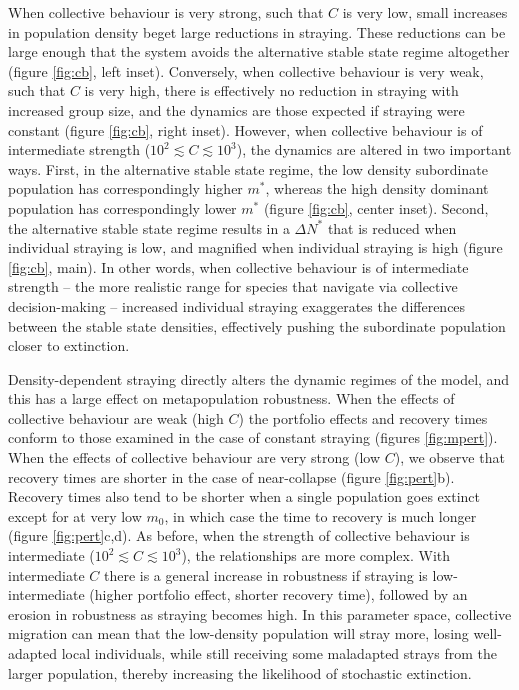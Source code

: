 \documentclass{revtex4}
\begin{document}
When collective behaviour is very strong, such that $C$ is very low, small increases in population density beget large reductions in straying.
These reductions can be large enough that the system avoids the alternative stable state regime altogether (figure \ref{fig:cb}, left inset).
Conversely, when collective behaviour is very weak, such that $C$ is very high, there is effectively no reduction in straying with increased group size, and the dynamics are those expected if straying were constant (figure \ref{fig:cb}, right inset).
However, when collective behaviour is of intermediate strength ($10^{2} \lesssim C \lesssim 10^3$), the dynamics are altered in two important ways.
First, in the alternative stable state regime, the low density subordinate population has correspondingly higher $m^*$, whereas the high density dominant population has correspondingly lower $m^*$ (figure \ref{fig:cb}, center inset).
Second, the alternative stable state regime results in a $\Delta N^*$ that is reduced when individual straying is low, and magnified when individual straying is high (figure \ref{fig:cb}, main).
In other words, when collective behaviour is of intermediate strength -- the more realistic range for species that navigate via collective decision-making -- increased individual straying exaggerates the differences between the stable state densities, effectively pushing the subordinate population closer to extinction.


Density-dependent straying directly alters the dynamic regimes of the model, and this has a large effect on metapopulation robustness.
When the effects of collective behaviour are weak (high $C$) the portfolio effects and recovery times conform to those examined in the case of constant straying (figures \ref{fig:mpert}).
When the effects of collective behaviour are very strong (low $C$), we observe that recovery times are shorter in the case of near-collapse (figure \ref{fig:pert}b).
Recovery times also tend to be shorter when a single population goes extinct except for at very low $m_0$, in which case the time to recovery is much longer (figure \ref{fig:pert}c,d).
As before, when the strength of collective behaviour is intermediate ($10^{2} \lesssim C \lesssim 10^3$), the relationships are more complex.
With intermediate $C$ there is a general increase in robustness if straying is low-intermediate (higher portfolio effect, shorter recovery time), followed by an erosion in robustness as straying becomes high.
In this parameter space, collective migration can mean that the low-density population will stray more, losing well-adapted local individuals, while still receiving some maladapted strays from the larger population, thereby increasing the likelihood of stochastic extinction.
\end{document}
